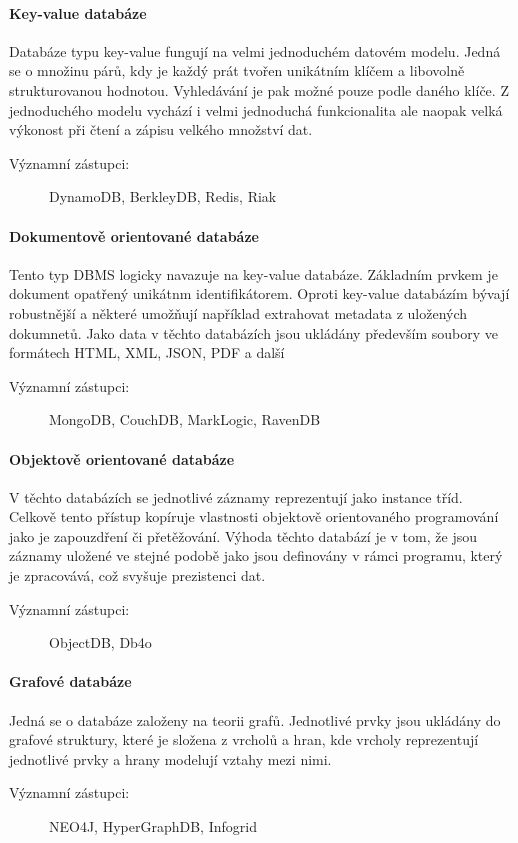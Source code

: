\documentclass[thesis=M,czech]{FITthesis}[2012/06/26]
\begin{document}
\paragraph{Key-value databáze}
Databáze typu key-value fungují na velmi jednoduchém datovém modelu. Jedná se o množinu párů, kdy je každý prát tvořen unikátním klíčem a libovolně strukturovanou hodnotou. Vyhledávání je pak možné pouze podle daného klíče. Z jednoduchého modelu vychází i velmi jednoduchá funkcionalita ale naopak velká výkonost při čtení a zápisu velkého množství dat.
\begin{description}
	\item[Významní zástupci: ] DynamoDB, BerkleyDB, Redis, Riak
\end{description}

\paragraph{Dokumentově orientované databáze}
Tento typ DBMS logicky navazuje na key-value databáze. Základním prvkem je dokument opatřený unikátnm identifikátorem. Oproti key-value databázím bývají robustnější a některé umožňují například extrahovat metadata z uložených dokumnetů. Jako data v těchto databázích jsou ukládány především soubory ve formátech HTML, XML, JSON, PDF a další
\begin{description}
	\item[Významní zástupci: ] MongoDB, CouchDB, MarkLogic, RavenDB
\end{description}

\paragraph{Objektově orientované databáze}
V těchto databázích se jednotlivé záznamy  reprezentují jako instance tříd.  Celkově tento přístup kopíruje vlastnosti objektově orientovaného programování jako je zapouzdření či přetěžování. Výhoda těchto databází je v tom, že jsou záznamy uložené ve stejné podobě jako jsou definovány v rámci programu, který je zpracovává, což svyšuje prezistenci dat.
\begin{description}
	\item[Významní zástupci: ] ObjectDB, Db4o
\end{description}

\paragraph{Grafové databáze}
Jedná se o databáze založeny na teorii grafů. Jednotlivé prvky jsou ukládány do grafové struktury, které je složena z vrcholů a hran, kde vrcholy reprezentují  jednotlivé prvky a hrany modelují vztahy mezi nimi.
\begin{description}
	\item[Významní zástupci: ] NEO4J, HyperGraphDB, Infogrid
\end{description}
\end{document}
